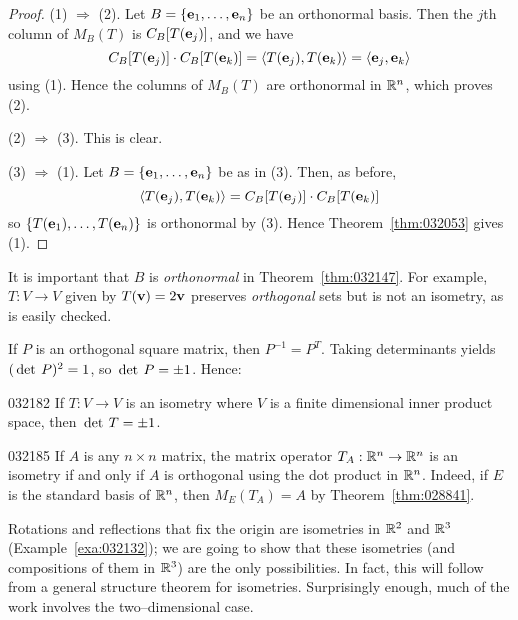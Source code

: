 \begin{proof}
(1) $\Rightarrow$ (2). Let $B = \{\textbf{e}_{1}, \dots, \textbf{e}_{n}\}$ be an orthonormal basis. Then the $j$th column of $M_{B}(T)$ is $C_{B}[T(\textbf{e}_{j})]$, and we have
\begin{equation*}
C_B[T(\textbf{e}_j)] \cdot C_B[T(\textbf{e}_k)] = \langle T(\textbf{e}_j), T(\textbf{e}_k) \rangle = \langle \textbf{e}_j, \textbf{e}_k \rangle
\end{equation*}
using (1). Hence the columns of $M_{B}(T)$ are orthonormal in $\mathbb{R}^n$, which proves (2).

(2) $\Rightarrow$ (3). This is clear.

(3) $\Rightarrow$ (1). Let $B = \{\textbf{e}_{1}, \dots, \textbf{e}_{n}\}$ be as in (3). Then, as before,
\begin{equation*}
\langle T(\textbf{e}_j), T(\textbf{e}_k) \rangle = C_B[T(\textbf{e}_j)] \cdot C_B[T(\textbf{e}_k)]
\end{equation*}
so $\{T(\textbf{e}_{1}), \dots, T(\textbf{e}_{n})\}$ is orthonormal by (3). Hence Theorem~\ref{thm:032053} gives (1).
\end{proof}

\noindent It is important that $B$ is \textit{orthonormal} in Theorem~\ref{thm:032147}. For example, $T : V \to V$ given by $T(\textbf{v}) = 2\textbf{v}$ preserves \textit{orthogonal} sets but is not an isometry, as is easily checked.

If $P$ is an orthogonal square matrix, then $P^{-1} = P^{T}$. Taking determinants yields $(\thinspace\operatorname{det\medspace} P)^{2} = 1$, so $\thinspace\operatorname{det\medspace} P = \pm 1$. Hence:

\begin{corollary}{}{032182}
If $T : V \to V$ is an isometry where $V$ is a finite dimensional inner product space, then $\thinspace\operatorname{det\medspace} T = \pm 1$.
\end{corollary}

\begin{example}{}{032185}
If $A$ is any $n \times n$ matrix, the matrix operator $T_{A}: \mathbb{R}^n \to \mathbb{R}^n$ is an isometry if and only if $A$ is orthogonal using the dot product in $\mathbb{R}^n$. Indeed, if $E$ is the standard basis of $\mathbb{R}^n$, then $M_{E}(T_{A}) = A$ by Theorem~\ref{thm:028841}.
\end{example}

Rotations and reflections that fix the origin are isometries in $\mathbb{R}^2$ and $\mathbb{R}^3$ (Example~\ref{exa:032132}); we are going to show that these isometries (and compositions of them in $\mathbb{R}^3$) are the only possibilities. In fact, this will follow from a general structure theorem for isometries. Surprisingly enough, much of the work involves the two--dimensional case.

